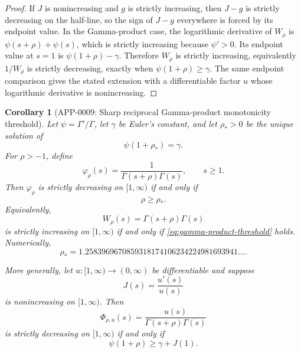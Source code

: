 \documentclass[11pt]{article}
\numberwithin{equation}{section}
\newtheorem{corollary}[theorem]{Corollary}
\theoremstyle{definition}
\theoremstyle{remark}
\newcommand{\1}{\mathbf 1}
\begin{document}
\begin{proof}
If \(J\) is nonincreasing and \(g\) is strictly increasing, then \(J-g\) is strictly decreasing on the half-line, so the sign of \(J-g\) everywhere is forced by its endpoint value. In the Gamma-product case, the logarithmic derivative of \(W_\rho\) is \(\psi(s+\rho)+\psi(s)\), which is strictly increasing because \(\psi'>0\). Its endpoint value at \(s=1\) is \(\psi(1+\rho)-\gamma\). Therefore \(W_\rho\) is strictly increasing, equivalently \(1/W_\rho\) is strictly decreasing, exactly when \(\psi(1+\rho)\ge\gamma\). The same endpoint comparison gives the stated extension with a differentiable factor \(u\) whose logarithmic derivative is nonincreasing.
\end{proof}

\begin{corollary}[APP-0009: Sharp reciprocal Gamma-product monotonicity threshold]
\label{thm:gamma-product-sharp-threshold}
Let \(\psi=\Gamma'/\Gamma\), let \(\gamma\) be Euler's constant, and let
\(\rho_*>0\) be the unique solution of
\begin{equation}
\label{eq:gamma-product-rho-star}
\psi(1+\rho_*)=\gamma.
\end{equation}
For \(\rho>-1\), define
\begin{equation}
\label{eq:gamma-product-reciprocal}
\varphi_\rho(s)=\frac{1}{\Gamma(s+\rho)\Gamma(s)},\qquad s\ge1.
\end{equation}
Then \(\varphi_\rho\) is strictly decreasing on \([1,\infty)\) if and only if
\begin{equation}
\label{eq:gamma-product-threshold}
\rho\ge\rho_*.
\end{equation}
Equivalently,
\begin{equation}
\label{eq:gamma-product-W}
W_\rho(s)=\Gamma(s+\rho)\Gamma(s)
\end{equation}
is strictly increasing on \([1,\infty)\) if and only if
\eqref{eq:gamma-product-threshold} holds.  Numerically,
\begin{equation}
\label{eq:gamma-product-rho-star-numeric}
\rho_*=1.2583969670859318174106234224981693941\ldots .
\end{equation}

More generally, let \(u:[1,\infty)\to(0,\infty)\) be differentiable and suppose
\begin{equation}
\label{eq:gamma-product-J}
J(s)=\frac{u'(s)}{u(s)}
\end{equation}
is nonincreasing on \([1,\infty)\).  Then
\begin{equation}
\label{eq:gamma-product-general-Phi}
\Phi_{\rho,u}(s)=\frac{u(s)}{\Gamma(s+\rho)\Gamma(s)}
\end{equation}
is strictly decreasing on \([1,\infty)\) if and only if
\begin{equation}
\label{eq:gamma-product-general-threshold}
\psi(1+\rho)\ge\gamma+J(1).
\end{equation}


\end{corollary}
\end{document}
